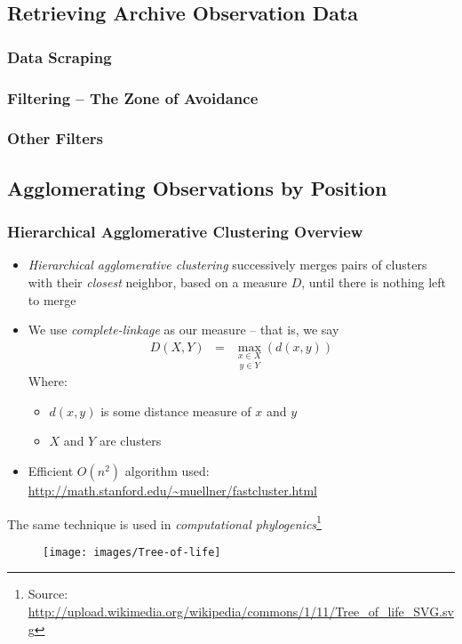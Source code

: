 \subsection{Retrieving Archive Observation Data}
\begin{frame}
\frametitle{Data Scraping}
\end{frame}
\begin{frame}
\frametitle{Filtering -- The Zone of Avoidance}
\end{frame}
\begin{frame}
\frametitle{Other Filters}
\end{frame}
\subsection{Agglomerating Observations by Position}
\begin{frame}[allowframebreaks]
\frametitle{Hierarchical Agglomerative Clustering Overview}
\begin{itemize}
	\item \emph{Hierarchical agglomerative clustering} successively merges pairs of clusters with their \emph{closest} neighbor, based on a measure $D$, until there is nothing left to merge
	\item We use \emph{complete-linkage} as our measure -- that is, we say
\begin{eqnarray*}
  D (X, Y) & = & \underset{y \in Y}{\underset{x \in X}{\max}} (d (x, y))
\end{eqnarray*}
	Where:
	\begin{itemize}
		\item $d(x,y)$ is some distance measure of $x$ and $y$
		\item $X$ and $Y$ are clusters
	\end{itemize}
	\item Efficient $O(n^2)$ algorithm used:\\
	{\small \url{http://math.stanford.edu/~muellner/fastcluster.html}}
\end{itemize}
\framebreak
	The same technique is used in \emph{computational phylogenics}\footnote{Source: \url{http://upload.wikimedia.org/wikipedia/commons/1/11/Tree_of_life_SVG.svg}}
\begin{figure}[h,b]
\centering
\texttt{[image: images/Tree-of-life]}
\end{figure}
\end{frame}
	
